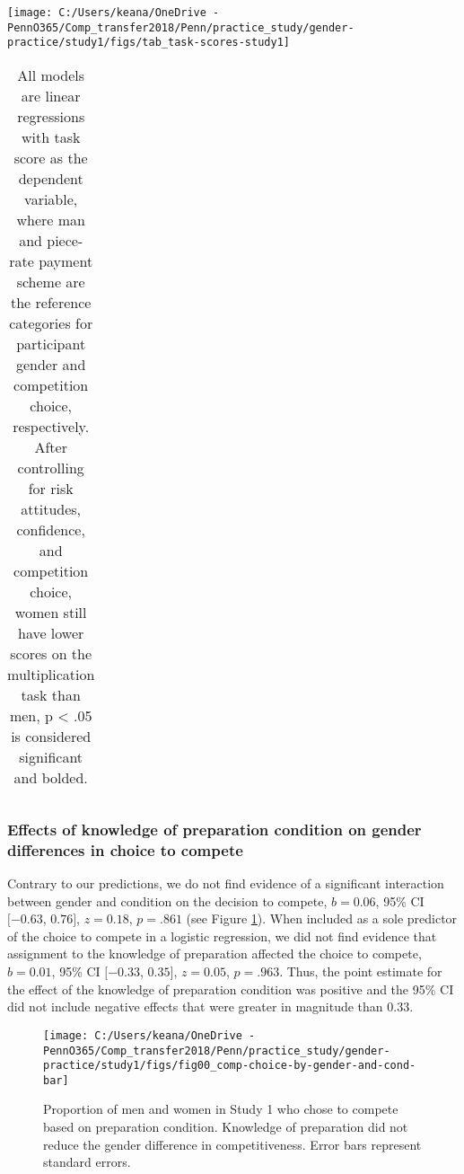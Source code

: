 \documentclass[letterpaper, nobind]{templates/ociamthesis}
\begin{document}
\newpage

\begin{center}\texttt{[image: C:/Users/keana/OneDrive - PennO365/Comp\_transfer2018/Penn/practice\_study/gender-practice/study1/figs/tab\_task-scores-study1]} \end{center}

\begin{table}[ht]
\centering
\begingroup\fontsize{0.1pt}{0.1pt}\selectfont
\begin{tabular}{r}
   \\ 
 \end{tabular}
\endgroup
\caption{All models are linear regressions with task score as the dependent variable, where man and piece-rate payment scheme are the reference categories for participant gender and competition choice, respectively. After controlling for risk attitudes, confidence, and competition choice, women still have lower scores on the multiplication task than men, p < .05 is considered significant and bolded.} 
\label{tab:tab-task-scores-study1}
\end{table}

\hypertarget{effects-of-knowledge-of-preparation-condition-on-gender-differences-in-choice-to-compete}{%
\subsubsection{Effects of knowledge of preparation condition on gender differences in choice to compete}\label{effects-of-knowledge-of-preparation-condition-on-gender-differences-in-choice-to-compete}}

Contrary to our predictions, we do not find evidence of a significant interaction between gender and condition on the decision to compete, \(b = 0.06\), 95\% CI \([-0.63\), \(0.76]\), \(z = 0.18\), \(p = .861\) (see Figure \ref{fig:s100}). When included as a sole predictor of the choice to compete in a logistic regression, we did not find evidence that assignment to the knowledge of preparation affected the choice to compete, \(b = 0.01\), 95\% CI \([-0.33\), \(0.35]\), \(z = 0.05\), \(p = .963\). Thus, the point estimate for the effect of the knowledge of preparation condition was positive and the 95\% CI did not include negative effects that were greater in magnitude than 0.33.

\begin{figure}

{\centering \texttt{[image: C:/Users/keana/OneDrive - PennO365/Comp\_transfer2018/Penn/practice\_study/gender-practice/study1/figs/fig00\_comp-choice-by-gender-and-cond-bar]} 

}

\caption{Proportion of men and women in Study 1 who chose to compete based on preparation condition. Knowledge of preparation did not reduce the gender difference in competitiveness. Error bars represent standard errors.}\label{fig:s100}
\end{figure}
\end{document}
